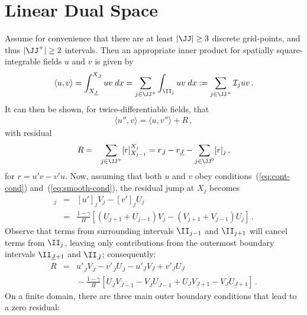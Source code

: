 \documentclass[12pt,a5paper]{article}
\begin{document}
\section{Linear Dual Space}
Assume for convenience that there are at least $|\JJ|\ge 3$ discrete grid-points, and thus $|\JJ^+|\ge 2$ intervals.
Then an appropriate inner product for spatially square-integrable fields $u$ and $v$ is given by
\begin{eqnarray}
\langle u,v\rangle = \int_{X_{\underline{J}}}^{X_{\bar{J}}}uv\;dx
= \sum_{j\in\JJ^+}\int_{\II_j}uv\;dx := \sum_{j\in\JJ^+}{\cal I}_j uv\,.
\label{eq:inner}
\end{eqnarray}
It can then be shown, for twice-differentiable fields, that
\begin{eqnarray}
\langle u'',v\rangle =
\langle u,v''\rangle + R\,,
\end{eqnarray}
with residual 
\begin{eqnarray}
R &= & \sum_{j\in\JJ^+}[r]_{X_{j-1}}^{X_j}
= r_{\bar{J}}-r_{\underline{J}}-\sum_{j\in\JJ^0}[r]_j\,,
\end{eqnarray}
for $r=u'v-v'u$.
Now, assuming that both $u$ and $v$ obey conditions~(\ref{eq:cont-cond}) and~(\ref{eq:smooth-cond}), 
the residual jump at $X_j$ becomes
\begin{eqnarray}
[r]_j & = & [u']_j V_j-[v']_j U_j
\nonumber\\
& = & \frac{1-\gamma}{H}\left[
(U_{j+1}+U_{j-1})V_j-(V_{j+1}+V_{j-1})U_j
\right]\,.
\end{eqnarray}
Observe that terms from surrounding intervals $\II_{j-1}$ and $\II_{j+1}$ will cancel terms from $\II_j$, leaving
only contributions from the outermost boundary intervals $\II_{\underline{J}+1}$ and $\II_{\bar{J}}$; consequently:
\begin{eqnarray}
R & = & 
u'_{\bar{J}}V_{\bar{J}}-v'_{\bar{J}}U_{\bar{J}}
-u'_{\underline{J}}V_{\underline{J}}+v'_{\underline{J}}U_{\underline{J}}
\nonumber\\ &&
{}-\frac{1-\gamma}{H}\left[
U_{\bar{J}}V_{\bar{J}-1}-V_{\bar{J}}U_{\bar{J}-1}
+U_{\underline{J}}V_{\underline{J}+1}-V_{\underline{J}}U_{\underline{J}+1}
\right]\,.
\end{eqnarray}
On a finite domain, there are three main outer boundary conditions that lead to a zero residual:
\end{document}

